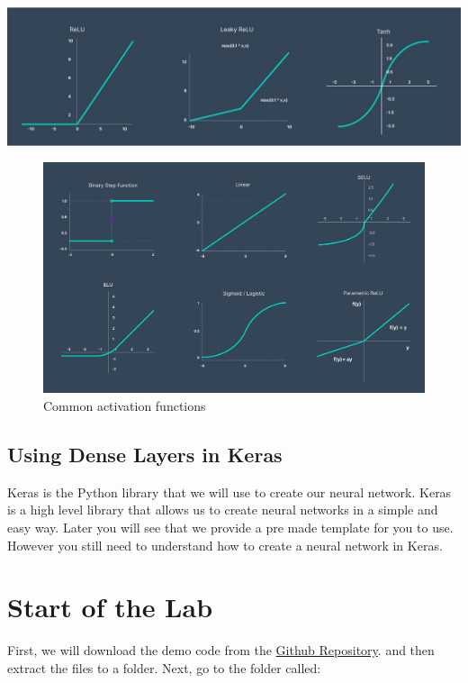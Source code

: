 \documentclass[11pt]{report}
\begin{document}
\includegraphics[width=1\textwidth]{activation functions 1.jpg}
\begin{figure}
    \begin{center}
    \includegraphics[width=1\textwidth]{activation functions 2.jpg}
    \caption{Common activation functions}
    \label{fig:activation_functions}
    \end{center}
\end{figure}

\pagebreak

\section{Using Dense Layers in Keras}
Keras is the Python library that we will use to create our neural network. Keras is a high level library that allows us to create neural networks in a simple and easy way. Later you will see that we provide a pre made template for you to use. However you still need to understand how to create a neural network in Keras.


\chapter{Start of the Lab}
First, we will download the demo code from the \href{https://github.com/PiCarV/Demos/archive/refs/heads/main.zip}{Github Repository}.
and then extract the files to a folder. Next, go to the folder called:
\end{document}
